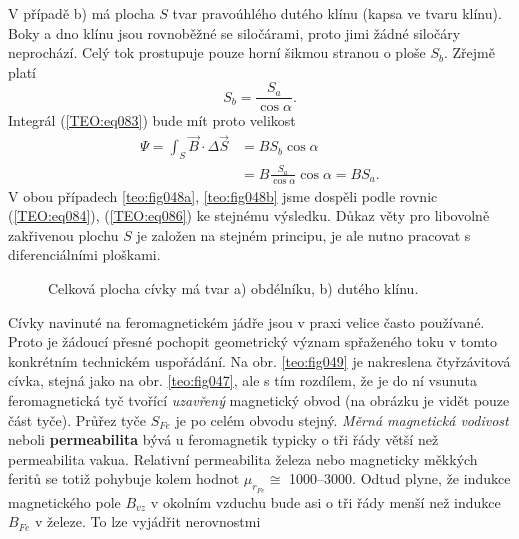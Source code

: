       V případě b) má plocha \(S\) tvar pravoúhlého dutého klínu (kapsa ve tvaru klínu). Boky a dno 
      klínu jsou rovnoběžné se siločárami, proto jimi žádné siločáry neprochází. Celý tok 
      prostupuje pouze horní šikmou stranou o ploše \(S_b\). Zřejmě platí
      \begin{equation}\label{TEO:eq085}
        S_b = \frac{S_a}{\cos\alpha}.
      \end{equation}
      Integrál (\ref{TEO:eq083}) bude mít proto velikost
      \begin{align}
        \Psi  = \int_S\vec{B}\cdot\Delta \vec{S} 
             &= BS_b\cos\alpha                                       \nonumber \\ 
             &= B\frac{S_a}{\cos\alpha}\cos\alpha = BS_a.            \label{TEO:eq086}
      \end{align}
      V obou případech \ref{teo:fig048a}, \ref{teo:fig048b} jsme dospěli podle rovnic
      (\ref{TEO:eq084}), (\ref{TEO:eq086}) ke stejnému výsledku. Důkaz věty pro libovolně zakřivenou
      plochu \(S\) je založen na stejném principu, je ale nutno pracovat s diferenciálními ploškami.
      \begin{figure}[ht!]
        \centering  
        \caption{Celková plocha cívky má tvar a) obdélníku, b) dutého klínu. \cite[s.~16]{Patocka4}} 
        \label{teo:fig048}
      \end{figure}
      
      Cívky navinuté na feromagnetickém jádře jsou v praxi velice často používané. Proto je žádoucí
      přesné pochopit geometrický význam spřaženého toku v tomto konkrétním technickém uspořádání.
      Na obr. \ref{teo:fig049} je nakreslena čtyřzávitová cívka, stejná jako na obr.
      \ref{teo:fig047}, ale s tím rozdílem, že je do ní vsunuta feromagnetická tyč tvořící
      \emph{uzavřený} magnetický obvod (na obrázku je vidět pouze část tyče). Průřez tyče \(S_{Fe}\)
      je po celém obvodu stejný. \emph{Měrná magnetická vodivost} neboli \textbf{permeabilita} bývá
      u feromagnetik typicky o tři řády větší než permeabilita vakua. Relativní permeabilita železa
      nebo magneticky měkkých feritů se totiž pohybuje kolem hodnot \(\mu_{r_{Fe}}\cong\)
      \numrange{1000}{3000}. Odtud plyne, že indukce magnetického pole \(B_{vz}\) v okolním vzduchu
      bude asi o tři řády menší než indukce \(B_{Fe}\) v železe. To lze vyjádřit nerovnostmi

